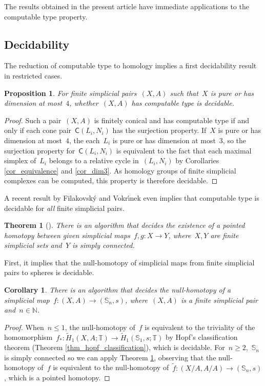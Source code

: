 \documentclass[english,11pt]{article}
\theoremstyle{plain}
\newtheorem{theorem}{Theorem}[section]
\newtheorem{proposition}{Proposition}[section]
\newtheorem{corollary}{Corollary}[section]
\theoremstyle{remark}
\theoremstyle{definition}
\newcommand{\Sp}{\mathbb{S}}
\newcommand{\R}{\mathbb{R}}
\newcommand{\Z}{\mathbb{Z}}
\newcommand{\N}{\mathbb{N}}
\newcommand{\RZ}{\mathbb{T}}%
\newcommand{\C}[1]{\mathsf{C}(#1)}%
\begin{document}
The results obtained in the present article have immediate applications to the computable type property.

\subsection{Decidability}
The reduction of computable type to homology implies a first decidability result in restricted cases.
\begin{proposition}
For finite simplicial pairs~$(X,A)$ such that~$X$ is pure or has dimension at most~$4$, whether~$(X,A)$ has computable type is decidable.
\end{proposition}
\begin{proof}
Such a pair~$(X,A)$ is finitely conical and has computable type if and only if each cone pair~$\C{L_i,N_i}$ has the surjection property. If~$X$ is pure or has dimension at most~$4$, the each~$L_i$ is pure or has dimension at most~$3$, so the surjection property for~$\C{L_i,N_i}$ is equivalent to the fact that each maximal simplex of~$L_i$ belongs to a relative cycle in~$(L_i,N_i)$ by Corollaries \ref{cor_equivalence} and \ref{cor_dim3}. As homology groups of finite simplicial complexes can be computed, this property is therefore decidable.
\end{proof}

A recent result by Filakovsk{\'{y}} and Vokr{\'{\i}}nek even implies that computable type is decidable for \emph{all} finite simplicial pairs.
\begin{theorem}[\cite{FV20}]\label{thm_decidable_homotopy}
There is an algorithm that decides the existence of a pointed homotopy between given simplicial maps~$f,g:X\to Y$, where~$X,Y$ are finite simplicial sets and~$Y$ is simply connected.
\end{theorem}
First, it implies that the null-homotopy of simplicial maps from finite simplicial pairs to spheres is decidable.
\begin{corollary}\label{cor_dec_null_hom}
There is an algorithm that decides the null-homotopy of a simplicial map~$f:(X,A)\to (\Sp_n,s)$, where~$(X,A)$ is a finite simplicial pair and~$n\in\N$.
\end{corollary}
\begin{proof}
When~$n\leq 1$, the null-homotopy of~$f$ is equivalent to the triviality of the homomorphism~$f_*:\tilde{H}_1(X,A;\RZ)\to \tilde{H}_1(\Sp_1,s;\RZ)$ by Hopf's classification theorem (Theorem \ref{thm_hopf_classification}), which is decidable. For~$n\geq 2$,~$\Sp_n$ is simply connected so we can apply Theorem \ref{thm_decidable_homotopy}, observing that the null-homotopy of~$f$ is equivalent to the null-homotopy of~$\tilde{f}:(X/A,A/A)\to (\Sp_n,s)$, which is a pointed homotopy.
\end{proof}
\end{document}
